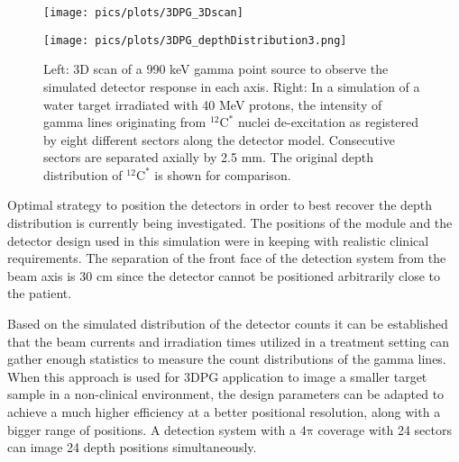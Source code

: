 \documentclass[11pt,a4paper]{article}
\begin{document}
\begin{figure}[h]  
\begin{minipage}[h]{0.49\linewidth}
{\centering\texttt{[image: pics/plots/3DPG\_3Dscan]}}
\end{minipage}
\begin{minipage}[h]{0.49\linewidth}
{\centering\texttt{[image: pics/plots/3DPG\_depthDistribution3.png]}}
\end{minipage}
\caption{ Left: 3D scan of a 990 keV gamma point source to observe the simulated detector response in each axis. Right: In a simulation of a water target irradiated with 40 MeV protons, the intensity of gamma lines originating from $\mathrm{^{12}C^*}$ nuclei de-excitation as registered by eight different sectors along the detector model. Consecutive sectors are separated axially by 2.5 mm.  The original depth distribution of $\mathrm{^{12}C^*}$  is shown for comparison.}
\label{fig_3D_depth}
\end{figure}


Optimal strategy to position the detectors in order to  best recover the depth distribution is currently being investigated. The positions of the module and the detector design used in this simulation were in keeping with realistic clinical requirements. The separation of the front face of the detection system from the beam axis is 30 cm since the detector cannot be positioned arbitrarily close to the patient. 

Based on the simulated distribution of the detector counts it can be established that the beam currents and irradiation times utilized in a treatment setting can gather enough statistics to measure the count distributions of the gamma lines. 
When this approach is used for 3DPG application to image a smaller target sample in a  non-clinical environment, the design parameters can be adapted to achieve a much higher efficiency at a better positional resolution, along with a bigger range of positions.  A detection system with a $\mathrm{4\pi}$ coverage with 24 sectors can image 24 depth positions simultaneously.
\end{document}
